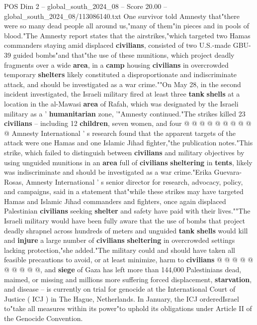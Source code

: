 \begin{textsample}{POS Dim 2 – global\_south\_2024\_08 – Score 20.00 – global\_south\_2024\_08/113086140.txt}
One survivor told Amnesty that"there were so many dead people all around us,"many of them"in pieces and in pools of blood."The Amnesty report states that the airstrikes,"which targeted two Hamas commanders staying amid displaced \textbf{civilians}, consisted of two U.S.-made GBU-39 guided bombs"and that"the use of these munitions, which project deadly fragments over a wide \textbf{area}, in a \textbf{camp} housing \textbf{civilians} in overcrowded temporary \textbf{shelters} likely constituted a disproportionate and indiscriminate attack, and should be investigated as a war crime.""On May 28, in the second incident investigated, the Israeli military fired at least three \textbf{tank} \textbf{shells} at a location in the al-Mawasi \textbf{area} of Rafah, which was designated by the Israeli military as a ' \textbf{humanitarian} zone, '"Amnesty continued."The strikes killed 23 \textbf{civilians} -- including 12 \textbf{children}, seven women, and four @ @ @ @ @ @ @ @ @ @ Amnesty International ' s research found that the apparent targets of the attack were one Hamas and one Islamic Jihad fighter,"the publication notes."This strike, which failed to distinguish between \textbf{civilians} and military objectives by using unguided munitions in an \textbf{area} full of \textbf{civilians} \textbf{sheltering} in \textbf{tents}, likely was indiscriminate and should be investigated as a war crime."Erika Guevara-Rosas, Amnesty International ' s senior director for research, advocacy, policy, and campaigns, said in a statement that"while these strikes may have targeted Hamas and Islamic Jihad commanders and fighters, once again displaced Palestinian \textbf{civilians} seeking \textbf{shelter} and safety have paid with their lives.""The Israeli military would have been fully aware that the use of bombs that project deadly shrapnel across hundreds of meters and unguided \textbf{tank} \textbf{shells} would kill and \textbf{injure} a large number of \textbf{civilians} \textbf{sheltering} in overcrowded settings lacking protection,"she added."The military could and should have taken all feasible precautions to avoid, or at least minimize, harm to \textbf{civilians} @ @ @ @ @ @ @ @ @ @, and \textbf{siege} of Gaza has left more than 144,000 Palestinians dead, maimed, or missing and millions more suffering forced displacement, \textbf{starvation}, and disease -- is currently on trial for genocide at the International Court of Justice ( ICJ ) in The Hague, Netherlands.
In January, the ICJ orderedIsrael to"take all measures within its power"to uphold its obligations under Article II of the Genocide Convention.

\end{textsample}
